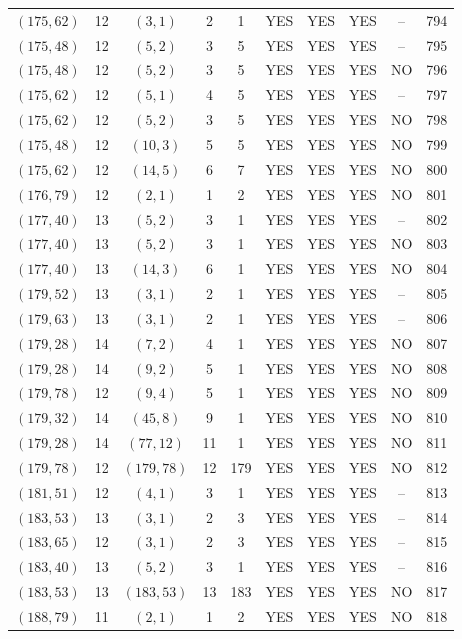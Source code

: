 \begin{longtable}{|c|c|c|c|c|c|c|c|c|c|}
$(175, 62)$ & 12 & $(3, 1)$ & 2 & 1 & YES & YES & YES & -- & 794\\
$(175, 48)$ & 12 & $(5, 2)$ & 3 & 5 & YES & YES & YES & -- & 795\\
$(175, 48)$ & 12 & $(5, 2)$ & 3 & 5 & YES & YES & YES & NO & 796\\
$(175, 62)$ & 12 & $(5, 1)$ & 4 & 5 & YES & YES & YES & -- & 797\\
$(175, 62)$ & 12 & $(5, 2)$ & 3 & 5 & YES & YES & YES & NO & 798\\
$(175, 48)$ & 12 & $(10, 3)$ & 5 & 5 & YES & YES & YES & NO & 799\\
$(175, 62)$ & 12 & $(14, 5)$ & 6 & 7 & YES & YES & YES & NO & 800\\
$(176, 79)$ & 12 & $(2, 1)$ & 1 & 2 & YES & YES & YES & NO & 801\\
$(177, 40)$ & 13 & $(5, 2)$ & 3 & 1 & YES & YES & YES & -- & 802\\
$(177, 40)$ & 13 & $(5, 2)$ & 3 & 1 & YES & YES & YES & NO & 803\\
$(177, 40)$ & 13 & $(14, 3)$ & 6 & 1 & YES & YES & YES & NO & 804\\
$(179, 52)$ & 13 & $(3, 1)$ & 2 & 1 & YES & YES & YES & -- & 805\\
$(179, 63)$ & 13 & $(3, 1)$ & 2 & 1 & YES & YES & YES & -- & 806\\
$(179, 28)$ & 14 & $(7, 2)$ & 4 & 1 & YES & YES & YES & NO & 807\\
$(179, 28)$ & 14 & $(9, 2)$ & 5 & 1 & YES & YES & YES & NO & 808\\
$(179, 78)$ & 12 & $(9, 4)$ & 5 & 1 & YES & YES & YES & NO & 809\\
$(179, 32)$ & 14 & $(45, 8)$ & 9 & 1 & YES & YES & YES & NO & 810\\
$(179, 28)$ & 14 & $(77, 12)$ & 11 & 1 & YES & YES & YES & NO & 811\\
$(179, 78)$ & 12 & $(179, 78)$ & 12 & 179 & YES & YES & YES & NO & 812\\
$(181, 51)$ & 12 & $(4, 1)$ & 3 & 1 & YES & YES & YES & -- & 813\\
$(183, 53)$ & 13 & $(3, 1)$ & 2 & 3 & YES & YES & YES & -- & 814\\
$(183, 65)$ & 12 & $(3, 1)$ & 2 & 3 & YES & YES & YES & -- & 815\\
$(183, 40)$ & 13 & $(5, 2)$ & 3 & 1 & YES & YES & YES & -- & 816\\
$(183, 53)$ & 13 & $(183, 53)$ & 13 & 183 & YES & YES & YES & NO & 817\\
$(188, 79)$ & 11 & $(2, 1)$ & 1 & 2 & YES & YES & YES & NO & 818\\

\end{longtable}
